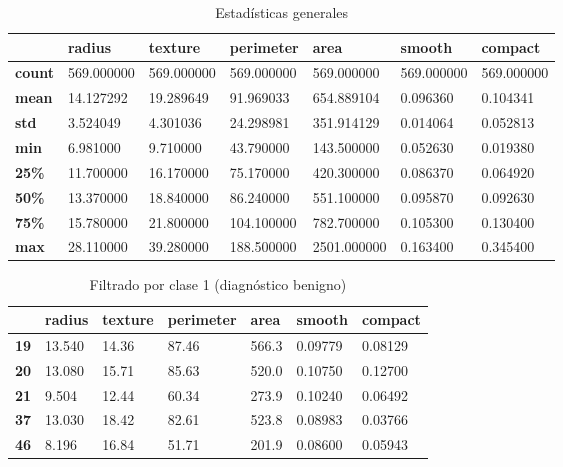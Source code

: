 \documentclass{llncs}
\begin{document}
\begin{table}[H]
    \label{tab:tabla2}
 	\caption{Estadísticas generales}
	\centering
	\begin{tabular}{C|CCCCCC}
 		\toprule
 		  & \textbf{radius} & \textbf{texture} & \textbf{perimeter} & \textbf{area} & \textbf{smooth }& \textbf{compact}\\
 		\midrule
 		\textbf{count} & 569.000000 & 569.000000 & 569.000000 & 569.000000 & 569.000000 & 569.000000 \\ 
   		\textbf{mean} & 14.127292 & 19.289649 & 91.969033 & 654.889104 & 0.096360 & 0.104341 \\
        \textbf{std} & 3.524049 & 4.301036 & 24.298981 & 351.914129 & 0.014064 & 0.052813 \\
        \textbf{min} & 6.981000 & 9.710000 & 43.790000 & 143.500000 & 0.052630 & 0.019380 \\
        \textbf{25\%} & 11.700000 & 16.170000 & 75.170000 & 420.300000 & 0.086370 & 0.064920 \\
        \textbf{50\%} & 13.370000 & 18.840000 & 86.240000 & 551.100000 & 0.095870 & 0.092630 \\
        \textbf{75\%} & 15.780000 & 21.800000 & 104.100000 & 782.700000 & 0.105300 & 0.130400 \\
        \textbf{max} & 28.110000 & 39.280000 & 188.500000 & 2501.000000 & 0.163400 & 0.345400 \\
 		\bottomrule
 	\end{tabular}
\end{table}
 
\begin{table}[H]
    \label{tab:tabla3}
 	\caption{Filtrado por clase 1 (diagnóstico benigno)}
	\centering
	\begin{tabular}{C|CCCCCC}
 		\toprule
 		  & \textbf{radius} & \textbf{texture} & \textbf{perimeter} & \textbf{area} & \textbf{smooth} & \textbf{compact}\\
 		\midrule
 		\textbf{19} & 13.540 & 14.36 & 87.46 & 566.3 & 0.09779 & 0.08129 \\ 
   		\textbf{20} & 13.080 & 15.71 & 85.63 & 520.0 & 0.10750 & 0.12700 \\
        \textbf{21} & 9.504 & 12.44 & 60.34 & 273.9 & 0.10240 & 0.06492 \\
        \textbf{37} & 13.030 & 18.42 & 82.61 & 523.8 & 0.08983 & 0.03766 \\
        \textbf{46} & 8.196 & 16.84 & 51.71 & 201.9 & 0.08600 & 0.05943 \\
 		\bottomrule
 	\end{tabular}
\end{table}
\end{document}

